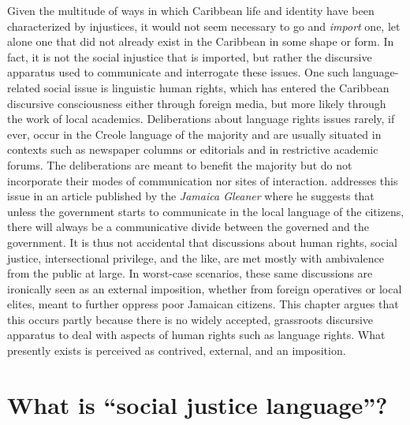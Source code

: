 \documentclass[output=paper,colorlinks,citecolor=brown]{langscibook}
\begin{document}
Given the multitude of ways in which Caribbean life and identity have been characterized by injustices, it would not seem necessary to go and \emph{import} one, let alone one that did not already exist in the Caribbean in some shape or form. In fact, it is not the social injustice that is imported, but rather the discursive apparatus used to communicate and interrogate these issues. One such language-related social issue is linguistic human rights, which has entered the Caribbean discursive consciousness either through foreign media, but more likely through the work of local academics. Deliberations about language rights issues rarely, if ever, occur in the Creole language of the majority and are usually situated in contexts such as newspaper columns or editorials and in restrictive academic forums. The deliberations are meant to benefit the majority but do not incorporate their modes of communication nor sites of interaction. \citet{Devonish2014} addresses this issue in an article published by the \textit{Jamaica Gleaner} where he suggests that unless the government starts to communicate in the local language of the citizens, there will always be a communicative divide between the governed and the government. It is thus not accidental that discussions about human rights, social justice, intersectional privilege, and the like, are met mostly with ambivalence from the public at large. In worst-case scenarios, these same discussions are ironically seen as an external imposition, whether from foreign operatives or local elites, meant to further oppress poor Jamaican citizens. This chapter argues that this occurs partly because there is no widely accepted, grassroots discursive apparatus to deal with aspects of human rights such as language rights. What presently exists is perceived as contrived, external, and an imposition. 


\section{What is “social justice language”?}
\end{document}
